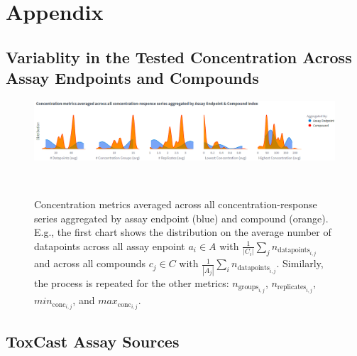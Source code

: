 \chapter{Appendix}\label{chap:appendix}
\section{Variablity in the Tested Concentration Across Assay Endpoints and Compounds}\label{sec:variability}
\begin{figure}[h]  %
    \centering
    \includegraphics[width=1.0\textwidth]{figures/concentration_metric_distributions.png}  
    \caption{Concentration metrics averaged across all concentration-response series aggregated by assay endpoint (blue) and compound (orange). E.g., the first chart shows the distribution on the average number of datapoints across all assay enpoint $a_i \in A$ with $\frac{1}{|C_i|} \sum_{j} n_{\text{datapoints}_{i,j}}$ and across all compounds $c_j \in C$ with $\frac{1}{|A_j|} \sum_{i} n_{\text{datapoints}_{i,j}}$. Similarly, the process is repeated for the other metrics: $n_{\text{groups}_{i,j}}$, $n_{\text{replicates}_{i,j}}$, $min_{\text{conc}_{i,j}}$, and $max_{\text{conc}_{i,j}}$.
    }
~\label{fig:concentration_metric_distributions} 
\end{figure}



\section{ToxCast Assay Sources}\label{sec:assay_source_names}

